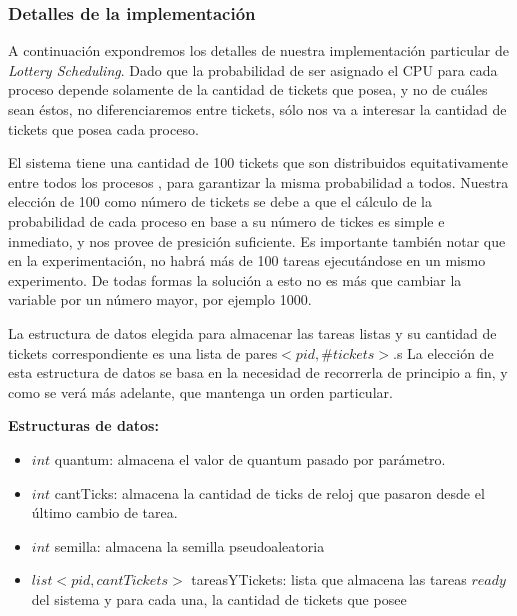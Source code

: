 \subsubsection{Detalles de la implementaci\'on}

A continuaci\'on expondremos los detalles de nuestra implementaci\'on particular de \textit{Lottery Scheduling}. Dado que la probabilidad de ser asignado el CPU para cada proceso depende solamente de la cantidad de tickets que posea, y no de cu\'ales sean \'estos, no diferenciaremos entre tickets, s\'olo nos va a interesar la cantidad de tickets que posea cada proceso.


\vspace{2mm}

El sistema tiene una cantidad de 100 tickets que son distribuidos equitativamente entre todos los procesos , para garantizar la misma probabilidad a todos. Nuestra elecci\'on de 100 como n\'umero de tickets se debe a que el c\'alculo de la probabilidad de cada proceso en base a su n\'umero de tickes es simple e inmediato, y nos provee de presici\'on suficiente. Es importante tambi\'en notar que en la experimentaci\'on, no habr\'a m\'as de 100 tareas ejecut\'andose en un mismo experimento. De todas formas la soluci\'on a esto no es m\'as que cambiar la variable por un n\'umero mayor, por ejemplo 1000.

\vspace{2mm}

La estructura de datos elegida para almacenar las tareas listas y su cantidad de tickets correspondiente es una lista de pares$<pid, \#tickets>$.s La elecci\'on de esta estructura de datos se basa en la necesidad de recorrerla de principio a fin, y como se ver\'a m\'as adelante, que mantenga un orden particular.

\vspace{2mm}

\textbf{Estructuras de datos:}

\begin{itemize}

\item $int$ quantum: almacena el valor de quantum pasado por par\'ametro.

\item $int$ cantTicks: almacena la cantidad de ticks de reloj que pasaron desde el \'ultimo cambio de tarea.

\item $int$ semilla: almacena la semilla pseudoaleatoria

\item $list<pid, cantTickets>$ tareasYTickets: lista que almacena las tareas $ready$ del sistema y para cada una, la cantidad de tickets que posee

\end{itemize}


